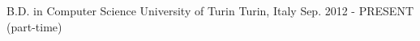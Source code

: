 


\begin{cventries}


\cventryy
{B.D. in Computer Science} %
{University of Turin} %
{Turin, Italy} %
{Sep. 2012 - PRESENT (part-time)} %


\end{cventries}